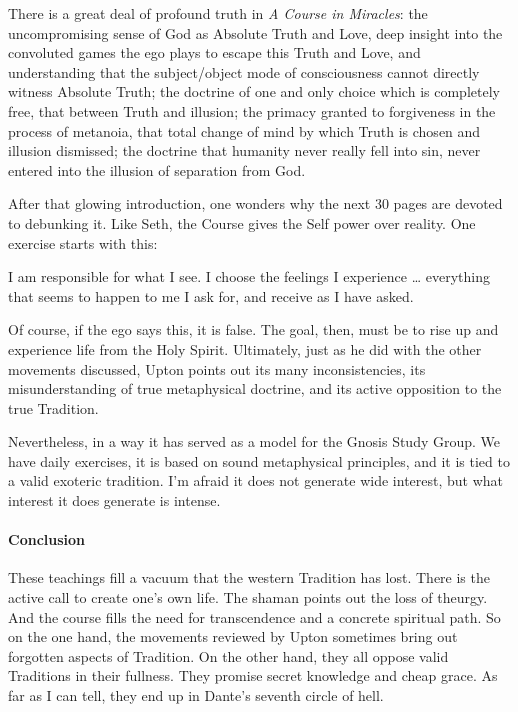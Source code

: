 \begin{quotex}
There is a great deal of profound truth in \emph{A Course in Miracles}: the uncompromising sense of God as Absolute Truth and Love, deep insight into the convoluted games the ego plays to escape this Truth and Love, and understanding that the subject/object mode of consciousness cannot directly witness Absolute Truth; the doctrine of one and only choice which is completely free, that between Truth and illusion; the primacy granted to forgiveness in the process of metanoia, that total change of mind by which Truth is chosen and illusion dismissed; the doctrine that humanity never really fell into sin, never entered into the illusion of separation from God. 

\end{quotex}
After that glowing introduction, one wonders why the next 30 pages are devoted to debunking it. Like Seth, the Course gives the Self power over reality. One exercise starts with this:

\begin{quotex}
I am responsible for what I see. I choose the feelings I experience … everything that seems to happen to me I ask for, and receive as I have asked. 

\end{quotex}
Of course, if the ego says this, it is false. The goal, then, must be to rise up and experience life from the Holy Spirit. Ultimately, just as he did with the other movements discussed, Upton points out its many inconsistencies, its misunderstanding of true metaphysical doctrine, and its active opposition to the true Tradition.

Nevertheless, in a way it has served as a model for the Gnosis Study Group. We have daily exercises, it is based on sound metaphysical principles, and it is tied to a valid exoteric tradition. I'm afraid it does not generate wide interest, but what interest it does generate is intense.

\paragraph{Conclusion}
These teachings fill a vacuum that the western Tradition has lost. There is the active call to create one's own life. The shaman points out the loss of theurgy. And the course fills the need for transcendence and a concrete spiritual path. So on the one hand, the movements reviewed by Upton sometimes bring out forgotten aspects of Tradition. On the other hand, they all oppose valid Traditions in their fullness. They promise secret knowledge and cheap grace. As far as I can tell, they end up in Dante's seventh circle of hell.


